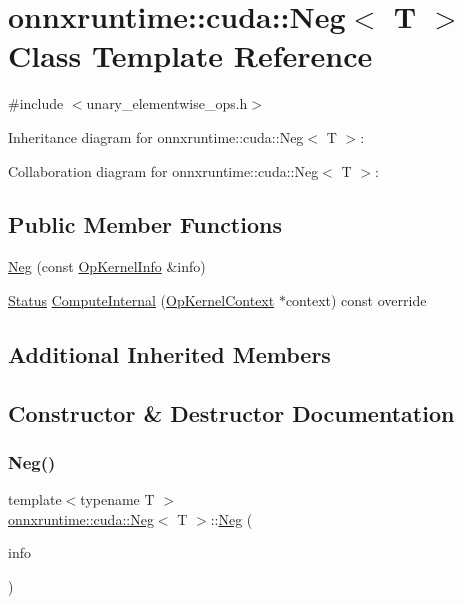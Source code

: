 \hypertarget{classonnxruntime_1_1cuda_1_1Neg}{}\section{onnxruntime\+:\+:cuda\+:\+:Neg$<$ T $>$ Class Template Reference}
\label{classonnxruntime_1_1cuda_1_1Neg}


{\ttfamily \#include $<$unary\+\_\+elementwise\+\_\+ops.\+h$>$}



Inheritance diagram for onnxruntime\+:\+:cuda\+:\+:Neg$<$ T $>$\+:


Collaboration diagram for onnxruntime\+:\+:cuda\+:\+:Neg$<$ T $>$\+:
\subsection*{Public Member Functions}
\begin{DoxyCompactItemize}
\item 
\mbox{\hyperlink{classonnxruntime_1_1cuda_1_1Neg_a0cf190e062b27f6ab51ad6f57e0c3f64}{Neg}} (const \mbox{\hyperlink{classonnxruntime_1_1OpKernelInfo}{Op\+Kernel\+Info}} \&info)
\item 
\mbox{\hyperlink{classonnxruntime_1_1common_1_1Status}{Status}} \mbox{\hyperlink{classonnxruntime_1_1cuda_1_1Neg_a7ff46cf8e38f3a9e57a428d33ef00e9e}{Compute\+Internal}} (\mbox{\hyperlink{classonnxruntime_1_1OpKernelContext}{Op\+Kernel\+Context}} $\ast$context) const override
\end{DoxyCompactItemize}
\subsection*{Additional Inherited Members}


\subsection{Constructor \& Destructor Documentation}
\mbox{\label{classonnxruntime_1_1cuda_1_1Neg_a0cf190e062b27f6ab51ad6f57e0c3f64}} 
\subsubsection{\texorpdfstring{Neg()}{Neg()}}
{\footnotesize\ttfamily template$<$typename T $>$ \\
\mbox{\hyperlink{classonnxruntime_1_1cuda_1_1Neg}{onnxruntime\+::cuda\+::\+Neg}}$<$ T $>$\+::\mbox{\hyperlink{classonnxruntime_1_1cuda_1_1Neg}{Neg}} (\begin{DoxyParamCaption}\item[{const \mbox{\hyperlink{classonnxruntime_1_1OpKernelInfo}{Op\+Kernel\+Info}} \&}]{info }\end{DoxyParamCaption})\hspace{0.3cm}{\ttfamily [inline]}}



